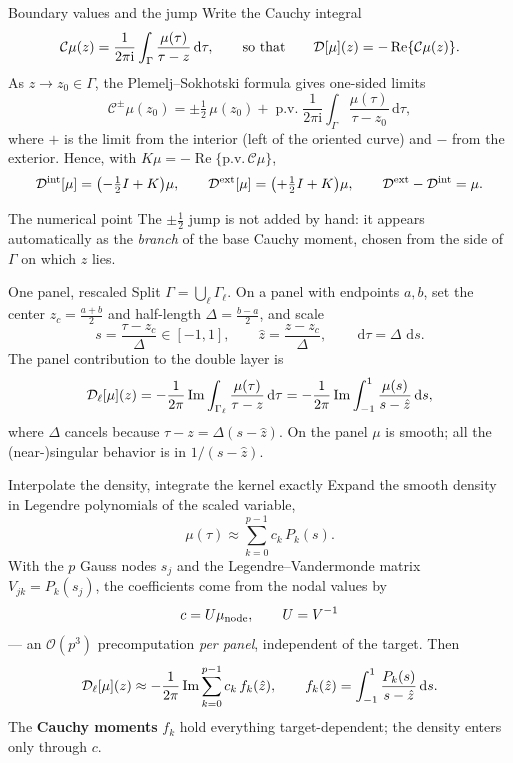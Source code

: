 \documentclass[aspectratio=169,11pt]{beamer}
\newcommand{\cO}{\mathcal{O}}
\newcommand{\dd}{\,\mathrm d}
\newcommand{\ii}{\mathrm i}
\newcommand{\hl}[1]{{\color{CCMorange}\textbf{#1}}}
\begin{document}
\begin{frame}{Boundary values and the jump}
\small
Write the Cauchy integral
\[
  \mathcal C\mu(z)=\frac{1}{2\pi\ii}\int_\Gamma\frac{\mu(\tau)}{\tau-z}\dd\tau,
  \qquad\text{so that}\qquad
  \Dop[\mu](z)=-\operatorname{Re}\{\mathcal C\mu(z)\}.
\]
As $z\to z_0\in\Gamma$, the Plemelj--Sokhotski formula gives one-sided limits
\[
  \mathcal C^{\pm}\mu(z_0)=\pm\tfrac12\,\mu(z_0)
  +\operatorname{p.v.}\frac{1}{2\pi\ii}\int_\Gamma\frac{\mu(\tau)}{\tau-z_0}\dd\tau,
\]
where $+$ is the limit from the interior (left of the oriented curve) and $-$
from the exterior.  Hence, with $K\mu=-\operatorname{Re}\{\text{p.v.}\,\mathcal C\mu\}$,
\[
  \mathcal{D}^{\rm int}[\mu]=\bigl(-\tfrac12 I+K\bigr)\mu,
  \qquad
  \mathcal{D}^{\rm ext}[\mu]=\bigl(+\tfrac12 I+K\bigr)\mu,
  \qquad
  \mathcal{D}^{\rm ext}-\mathcal{D}^{\rm int}=\mu.
\]
\begin{block}{The numerical point}
The $\pm\tfrac12$ jump is not added by hand: it appears automatically as the
\emph{branch} of the base Cauchy moment, chosen from the side of $\Gamma$ on
which $z$ lies.
\end{block}
\end{frame}

\begin{frame}{One panel, rescaled}
\small
Split $\Gamma=\bigcup_\ell\Gamma_\ell$.  On a panel with endpoints $a,b$, set the
center $z_c=\tfrac{a+b}{2}$ and half-length $\Delta=\tfrac{b-a}{2}$, and scale
\[
  s=\frac{\tau-z_c}{\Delta}\in[-1,1],
  \qquad
  \hat z=\frac{z-z_c}{\Delta},
  \qquad
  \dd\tau=\Delta\,\dd s.
\]
The panel contribution to the double layer is
\[
  \Dop_\ell[\mu](z)
  =-\frac{1}{2\pi}\operatorname{Im}\int_{\Gamma_\ell}\frac{\mu(\tau)}{\tau-z}\dd\tau
  =-\frac{1}{2\pi}\operatorname{Im}\int_{-1}^{1}\frac{\mu(s)}{s-\hat z}\dd s,
\]
where $\Delta$ cancels because $\tau-z=\Delta(s-\hat z)$.  On the panel $\mu$ is
smooth; all the (near-)singular behavior is in $1/(s-\hat z)$.
\end{frame}

\begin{frame}{Interpolate the density, integrate the kernel exactly}
\small
Expand the smooth density in Legendre polynomials of the scaled variable,
\[
  \mu(\tau)\approx\sum_{k=0}^{p-1}c_k\,P_k(s).
\]
With the $p$ Gauss nodes $s_j$ and the Legendre--Vandermonde matrix
$V_{jk}=P_k(s_j)$, the coefficients come from the nodal values by
\[
  c=U\mu_{\rm node},
  \qquad
  U=V^{-1}
\]
--- an $\cO(p^3)$ precomputation \emph{per panel}, independent of the target.
Then
\[
  \Dop_\ell[\mu](z)\approx
  -\frac{1}{2\pi}\operatorname{Im}\sum_{k=0}^{p-1}c_k\,f_k(\hat z),
  \qquad
  f_k(\hat z)=\int_{-1}^{1}\frac{P_k(s)}{s-\hat z}\dd s.
\]
The \hl{Cauchy moments} $f_k$ hold everything target-dependent; the density
enters only through $c$.
\end{frame}
\end{document}

